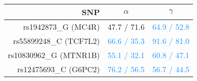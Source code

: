 \begin{tabular}{rcc}
  \hline
SNP & $\alpha$ & $\gamma$ \\ 
  \hline
rs1942873\_G (MC4R) & 47.7 / 71.6 & \textcolor{dodgerblue}{64.9 / 52.8} \\ 
  rs55899248\_C (TCF7L2) & \textcolor{dodgerblue}{66.6 / 35.3} & \textcolor{dodgerblue}{91.6 / 81.0} \\ 
  rs10830962\_G (MTNR1B) & \textcolor{dodgerblue}{55.1 / 32.1} & \textcolor{dodgerblue}{60.8 / 47.1} \\ 
  rs12475693\_C (G6PC2) & \textcolor{dodgerblue}{76.2 / 56.5} & \textcolor{dodgerblue}{56.7 / 44.5} \\ 
   \hline
\end{tabular}

